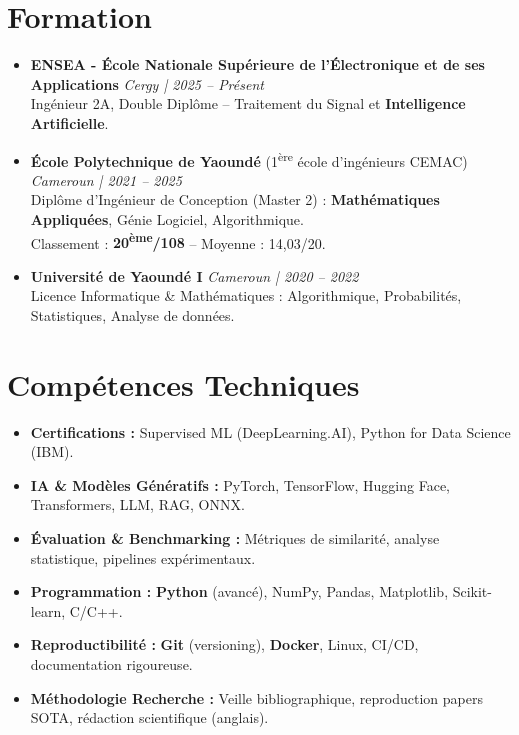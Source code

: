 \documentclass[a4paper,11pt]{article}
\begin{document}
\section{Formation}
\begin{itemize}[leftmargin=*, label=\tiny$\bullet$, nosep]
    \item \textbf{ENSEA - École Nationale Supérieure de l'Électronique et de ses Applications} \hfill \textit{Cergy | 2025 -- Présent} \\
    \small{Ingénieur 2A, Double Diplôme -- Traitement du Signal et \textbf{Intelligence Artificielle}.}
    \vspace{2pt}
    \item \textbf{École Polytechnique de Yaoundé} (1\textsuperscript{ère} école d'ingénieurs CEMAC) \hfill \textit{Cameroun | 2021 -- 2025} \\
    \small{Diplôme d'Ingénieur de Conception (Master 2) : \textbf{Mathématiques Appliquées}, Génie Logiciel, Algorithmique.} \\
    \small{Classement : \textbf{20\textsuperscript{ème}/108} -- Moyenne : 14,03/20.}
    \vspace{2pt}
    \item \textbf{Université de Yaoundé I} \hfill \textit{Cameroun | 2020 -- 2022} \\
    \small{Licence Informatique \& Mathématiques : Algorithmique, Probabilités, Statistiques, Analyse de données.}
\end{itemize}

\section{Compétences Techniques}
\begin{itemize}[leftmargin=*, itemsep=2pt]
    \item \small{\textbf{Certifications :} Supervised ML (DeepLearning.AI), Python for Data Science (IBM).}
    \item \small{\textbf{IA \& Modèles Génératifs :} PyTorch, TensorFlow, Hugging Face, Transformers, LLM, RAG, ONNX.}
    \item \small{\textbf{Évaluation \& Benchmarking :} Métriques de similarité, analyse statistique, pipelines expérimentaux.}
    \item \small{\textbf{Programmation :} \textbf{Python} (avancé), NumPy, Pandas, Matplotlib, Scikit-learn, C/C++.}
    \item \small{\textbf{Reproductibilité :} \textbf{Git} (versioning), \textbf{Docker}, Linux, CI/CD, documentation rigoureuse.}
    \item \small{\textbf{Méthodologie Recherche :} Veille bibliographique, reproduction papers SOTA, rédaction scientifique (anglais).}
\end{itemize}
\end{document}
